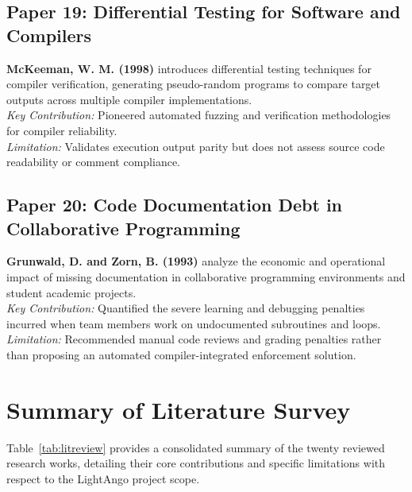 \subsection{Paper 19: Differential Testing for Software and Compilers}
\textbf{McKeeman, W. M. (1998)} \cite{mckeeman1998differential} introduces differential testing techniques for compiler verification, generating pseudo-random programs to compare target outputs across multiple compiler implementations. \\
\textit{Key Contribution:} Pioneered automated fuzzing and verification methodologies for compiler reliability. \\
\textit{Limitation:} Validates execution output parity but does not assess source code readability or comment compliance.

\subsection{Paper 20: Code Documentation Debt in Collaborative Programming}
\textbf{Grunwald, D. and Zorn, B. (1993)} \cite{grunwald1993custom} analyze the economic and operational impact of missing documentation in collaborative programming environments and student academic projects. \\
\textit{Key Contribution:} Quantified the severe learning and debugging penalties incurred when team members work on undocumented subroutines and loops. \\
\textit{Limitation:} Recommended manual code reviews and grading penalties rather than proposing an automated compiler-integrated enforcement solution.

\newpage
\section{Summary of Literature Survey}
Table~\ref{tab:litreview} provides a consolidated summary of the twenty reviewed research works, detailing their core contributions and specific limitations with respect to the LightAngo project scope.

